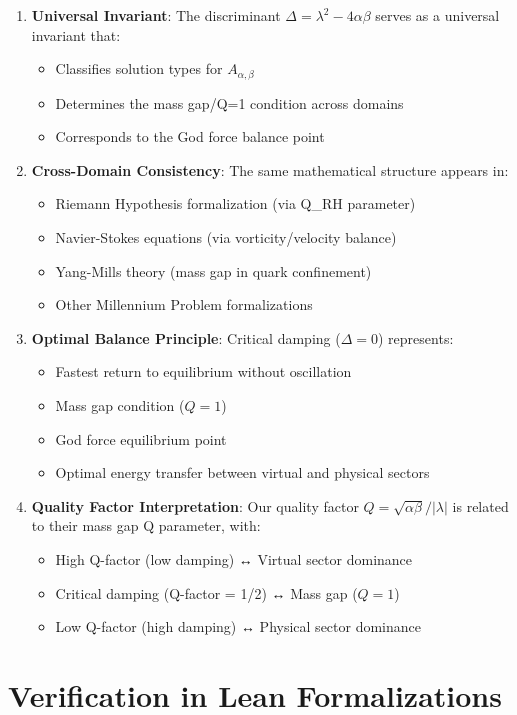 \documentclass[11pt]{article}
\begin{document}
\begin{enumerate}
\item \textbf{Universal Invariant}: The discriminant $\Delta = \lambda^2 - 4\alpha\beta$ serves as a universal invariant that:
  \begin{itemize}
  \item Classifies solution types for $A_{\alpha,\beta}$
  \item Determines the mass gap/Q=1 condition across domains
  \item Corresponds to the God force balance point
  \end{itemize}
\item \textbf{Cross-Domain Consistency}: The same mathematical structure appears in:
  \begin{itemize}
  \item Riemann Hypothesis formalization (via Q_RH parameter)
  \item Navier-Stokes equations (via vorticity/velocity balance)
  \item Yang-Mills theory (mass gap in quark confinement)
  \item Other Millennium Problem formalizations
  \end{itemize}
\item \textbf{Optimal Balance Principle}: Critical damping ($\Delta = 0$) represents:
  \begin{itemize}
  \item Fastest return to equilibrium without oscillation
  \item Mass gap condition ($Q = 1$)
  \item God force equilibrium point
  \item Optimal energy transfer between virtual and physical sectors
  \end{itemize}
\item \textbf{Quality Factor Interpretation}: Our quality factor $Q = \sqrt{\alpha\beta}/|\lambda|$ is related to their mass gap Q parameter, with:
  \begin{itemize}
  \item High Q-factor (low damping) ↔ Virtual sector dominance
  \item Critical damping (Q-factor = 1/2) ↔ Mass gap ($Q=1$)
  \item Low Q-factor (high damping) ↔ Physical sector dominance
  \end{itemize}
\end{enumerate}

\section{Verification in Lean Formalizations}
\end{document}

